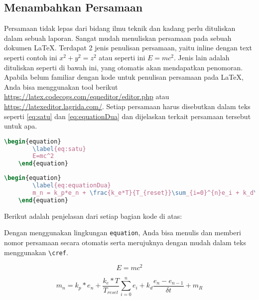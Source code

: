 \subsection{Menambahkan Persamaan}

Persamaan tidak lepas dari bidang ilmu teknik dan kadang perlu dituliskan dalam sebuah laporan. Sangat mudah menuliskan persamaan pada sebuah dokumen \LaTeX. Terdapat 2 jenis penulisan persamaan, yaitu inline dengan text seperti contoh ini \(x^2 + y^2 = z^2\) atau seperti ini $E=mc^2$. Jenis lain adalah dituliskan seperti di bawah ini, yang otomatis akan mendapatkan penomoran. Apabila belum familiar dengan kode untuk penulisan persamaan pada \LaTeX, Anda bisa menggunakan tool berikut \url{https://latex.codecogs.com/eqneditor/editor.php} atau \url{https://latexeditor.lagrida.com/}. Setiap persamaan harus disebutkan dalam teks seperti \cref{eq:satu} dan \cref{eq:equationDua} dan dijelaskan terkait persamaan tersebut untuk apa.

\begin{lstlisting}[language=TeX, caption=Kode untuk Menulis Persamaan, label=lst:kode_persamaan_emc]
    \begin{equation}
        \label{eq:satu}
        E=mc^2
    \end{equation}
\end{lstlisting}

\begin{lstlisting}[language=TeX, caption=Kode untuk Menulis Persamaan, label=lst:kode_persamaan_mn]
    \begin{equation}
        \label{eq:equationDua}
        m_n = k_p*e_n + \frac{k_e*T}{T_{reset}}\sum_{i=0}^{n}e_i + k_d\frac{e_n - e_{n-1}}{\delta t} + m_{R}
    \end{equation}
\end{lstlisting}

\noindent Berikut adalah penjelasan dari setiap bagian kode di atas:

Dengan menggunakan lingkungan \texttt{equation}, Anda bisa menulis dan memberi nomor persamaan secara otomatis serta merujuknya dengan mudah dalam teks menggunakan \texttt{\textbackslash cref}.

\begin{equation}
    \label{eq:satu}
    E=mc^2
\end{equation}

\begin{equation}
    \label{eq:equationDua}
    m_n = k_p*e_n + \frac{k_e*T}{T_{reset}}\sum_{i=0}^{n}e_i + k_d\frac{e_n - e_{n-1}}{\delta t} + m_{R}
\end{equation}


